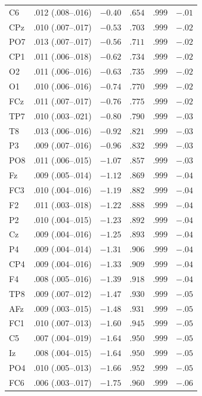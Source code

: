 {\begin{longtable}{llrrrr}
C6 & .012 (.008--.016) & $-0.40$ & $.654$ & $.999$ & $-.01$ \\
CPz & .010 (.007--.017) & $-0.53$ & $.703$ & $.999$ & $-.02$ \\
PO7 & .013 (.007--.017) & $-0.56$ & $.711$ & $.999$ & $-.02$ \\
CP1 & .011 (.006--.018) & $-0.62$ & $.734$ & $.999$ & $-.02$ \\
O2 & .011 (.006--.016) & $-0.63$ & $.735$ & $.999$ & $-.02$ \\
O1 & .010 (.006--.016) & $-0.74$ & $.770$ & $.999$ & $-.02$ \\
FCz & .011 (.007--.017) & $-0.76$ & $.775$ & $.999$ & $-.02$ \\
TP7 & .010 (.003--.021) & $-0.80$ & $.790$ & $.999$ & $-.03$ \\
T8 & .013 (.006--.016) & $-0.92$ & $.821$ & $.999$ & $-.03$ \\
P3 & .009 (.007--.016) & $-0.96$ & $.832$ & $.999$ & $-.03$ \\
PO8 & .011 (.006--.015) & $-1.07$ & $.857$ & $.999$ & $-.03$ \\
Fz & .009 (.005--.014) & $-1.12$ & $.869$ & $.999$ & $-.04$ \\
FC3 & .010 (.004--.016) & $-1.19$ & $.882$ & $.999$ & $-.04$ \\
F2 & .011 (.003--.018) & $-1.22$ & $.888$ & $.999$ & $-.04$ \\
P2 & .010 (.004--.015) & $-1.23$ & $.892$ & $.999$ & $-.04$ \\
Cz & .009 (.004--.016) & $-1.25$ & $.893$ & $.999$ & $-.04$ \\
P4 & .009 (.004--.014) & $-1.31$ & $.906$ & $.999$ & $-.04$ \\
CP4 & .009 (.004--.016) & $-1.33$ & $.909$ & $.999$ & $-.04$ \\
F4 & .008 (.005--.016) & $-1.39$ & $.918$ & $.999$ & $-.04$ \\
TP8 & .009 (.007--.012) & $-1.47$ & $.930$ & $.999$ & $-.05$ \\
AFz & .009 (.003--.015) & $-1.48$ & $.931$ & $.999$ & $-.05$ \\
FC1 & .010 (.007--.013) & $-1.60$ & $.945$ & $.999$ & $-.05$ \\
C5 & .007 (.004--.019) & $-1.64$ & $.950$ & $.999$ & $-.05$ \\
Iz & .008 (.004--.015) & $-1.64$ & $.950$ & $.999$ & $-.05$ \\
PO4 & .010 (.005--.013) & $-1.66$ & $.952$ & $.999$ & $-.05$ \\
FC6 & .006 (.003--.017) & $-1.75$ & $.960$ & $.999$ & $-.06$ \\

\end{longtable}}
